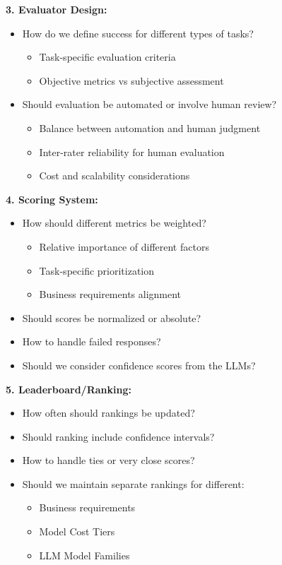 \textbf{3. Evaluator Design:}
\begin{itemize}
    \item How do we define success for different types of tasks?
    \begin{itemize}
        \item Task-specific evaluation criteria
        \item Objective metrics vs subjective assessment
    \end{itemize}
    \item Should evaluation be automated or involve human review?
    \begin{itemize}
        \item Balance between automation and human judgment
        \item Inter-rater reliability for human evaluation
        \item Cost and scalability considerations
    \end{itemize}
\end{itemize}

\textbf{4. Scoring System:}
\begin{itemize}
    \item How should different metrics be weighted?
    \begin{itemize}
        \item Relative importance of different factors
        \item Task-specific prioritization
        \item Business requirements alignment
    \end{itemize}
    \item Should scores be normalized or absolute?
    \item How to handle failed responses?
    \item Should we consider confidence scores from the LLMs?~
\end{itemize}

\textbf{5. Leaderboard/Ranking:}
\begin{itemize}
    \item How often should rankings be updated?
    \item Should ranking include confidence intervals?
    \item How to handle ties or very close scores?
    \item Should we maintain separate rankings for different:
    \begin{itemize}
        \item Business requirements
        \item Model Cost Tiers
        \item LLM Model Families
    \end{itemize}
\end{itemize}

